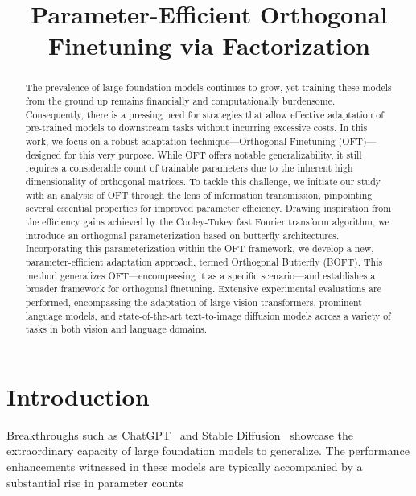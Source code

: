 \title{Parameter-Efficient Orthogonal Finetuning via Factorization}

\begin{abstract}
The prevalence of large foundation models continues to grow, yet training these models from the ground up remains financially and computationally burdensome. Consequently, there is a pressing need for strategies that allow effective adaptation of pre-trained models to downstream tasks without incurring excessive costs. In this work, we focus on a robust adaptation technique—Orthogonal Finetuning (OFT)—designed for this very purpose. While OFT offers notable generalizability, it still requires a considerable count of trainable parameters due to the inherent high dimensionality of orthogonal matrices. To tackle this challenge, we initiate our study with an analysis of OFT through the lens of information transmission, pinpointing several essential properties for improved parameter efficiency. Drawing inspiration from the efficiency gains achieved by the Cooley-Tukey fast Fourier transform algorithm, we introduce an orthogonal parameterization based on butterfly architectures. Incorporating this parameterization within the OFT framework, we develop a new, parameter-efficient adaptation approach, termed Orthogonal Butterfly (BOFT). This method generalizes OFT—encompassing it as a specific scenario—and establishes a broader framework for orthogonal finetuning. Extensive experimental evaluations are performed, encompassing the adaptation of large vision transformers, prominent language models, and state-of-the-art text-to-image diffusion models across a variety of tasks in both vision and language domains.
\end{abstract}

\section{Introduction}

Breakthroughs such as ChatGPT~\cite{brown2020language,chen2021evaluating} and Stable Diffusion~\cite{rombach2022high} showcase the extraordinary capacity of large foundation models to generalize. The performance enhancements witnessed in these models are typically accompanied by a substantial rise in parameter counts

